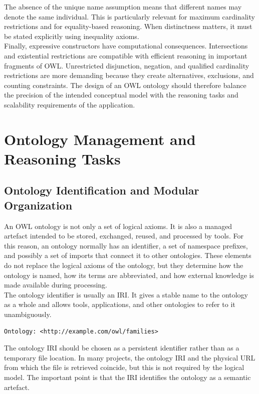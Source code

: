 \documentclass{scrbook}
\begin{document}
	The absence of the unique name assumption means that different names may denote the same individual. This is particularly relevant for maximum cardinality restrictions and for equality-based reasoning. When distinctness matters, it must be stated explicitly using inequality axioms.\\
	
	Finally, expressive constructors have computational consequences. Intersections and existential restrictions are compatible with efficient reasoning in important fragments of OWL. Unrestricted disjunction, negation, and qualified cardinality restrictions are more demanding because they create alternatives, exclusions, and counting constraints. The design of an OWL ontology should therefore balance the precision of the intended conceptual model with the reasoning tasks and scalability requirements of the application.
	
	\chapter{Ontology Management and Reasoning Tasks}
	
	\section{Ontology Identification and Modular Organization}
	
	An OWL ontology is not only a set of logical axioms. It is also a managed artefact intended to be stored, exchanged, reused, and processed by tools. For this reason, an ontology normally has an identifier, a set of namespace prefixes, and possibly a set of imports that connect it to other ontologies. These elements do not replace the logical axioms of the ontology, but they determine how the ontology is named, how its terms are abbreviated, and how external knowledge is made available during processing.\\
	
	The ontology identifier is usually an IRI. It gives a stable name to the ontology as a whole and allows tools, applications, and other ontologies to refer to it unambiguously.
	
	\begin{lstlisting}
Ontology: <http://example.com/owl/families>
	\end{lstlisting}
	
	The ontology IRI should be chosen as a persistent identifier rather than as a temporary file location. In many projects, the ontology IRI and the physical URL from which the file is retrieved coincide, but this is not required by the logical model. The important point is that the IRI identifies the ontology as a semantic artefact.
	
\end{document}

